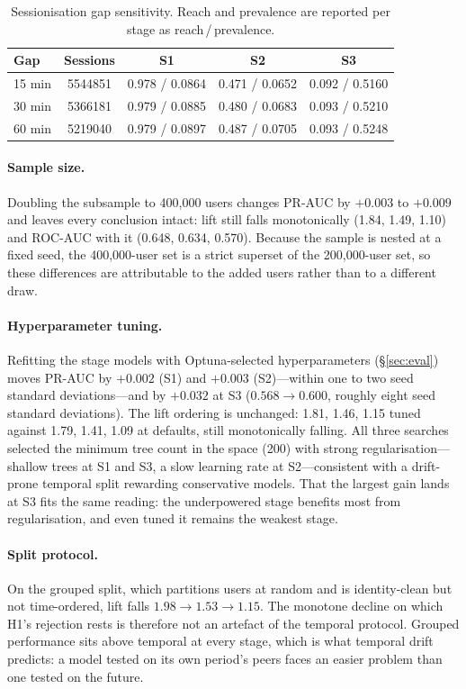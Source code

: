 \documentclass[review,3p,times,authoryear]{elsarticle}   %
\begin{document}
\begin{table}[t]
\centering
\caption{Sessionisation gap sensitivity. Reach and prevalence are reported per
stage as reach\,/\,prevalence.}
\label{tab:gap}
\small
\begin{tabular}{@{}lS[table-format=7.0]ccc@{}}
\toprule
\textbf{Gap} & {\textbf{Sessions}} & \textbf{S1} & \textbf{S2} & \textbf{S3} \\
 min & 5544851 & 0.978 / 0.0864 & 0.471 / 0.0652 & 0.092 / 0.5160 \\
30 min & 5366181 & 0.979 / 0.0885 & 0.480 / 0.0683 & 0.093 / 0.5210 \\
60 min & 5219040 & 0.979 / 0.0897 & 0.487 / 0.0705 & 0.093 / 0.5248 \\
\bottomrule
\end{tabular}
\end{table}

\paragraph{Sample size.}
Doubling the subsample to 400,000 users changes PR-AUC by $+0.003$ to $+0.009$ and
leaves every conclusion intact: lift still falls monotonically (1.84, 1.49, 1.10)
and ROC-AUC with it (0.648, 0.634, 0.570). Because the sample is nested at a fixed
seed, the 400,000-user set is a strict superset of the 200,000-user set, so these
differences are attributable to the added users rather than to a different draw.

\paragraph{Hyperparameter tuning.}
Refitting the stage models with Optuna-selected hyperparameters (\S\ref{sec:eval})
moves PR-AUC by $+0.002$ (S1) and $+0.003$ (S2)---within one to two seed standard
deviations---and by $+0.032$ at S3 ($0.568 \to 0.600$, roughly eight seed standard
deviations). The lift ordering is unchanged: 1.81, 1.46, 1.15 tuned against 1.79,
1.41, 1.09 at defaults, still monotonically falling. All three searches selected
the minimum tree count in the space (200) with strong regularisation---shallow
trees at S1 and S3, a slow learning rate at S2---consistent with a drift-prone
temporal split rewarding conservative models. That the largest gain lands at S3
fits the same reading: the underpowered stage benefits most from regularisation,
and even tuned it remains the weakest stage.

\paragraph{Split protocol.}
On the grouped split, which partitions users at random and is identity-clean but
not time-ordered, lift falls $1.98 \to 1.53 \to 1.15$. The monotone decline on
which H1's rejection rests is therefore not an artefact of the temporal protocol.
Grouped performance sits above temporal at every stage, which is what temporal
drift predicts: a model tested on its own period's peers faces an easier problem
than one tested on the future.
\end{document}
